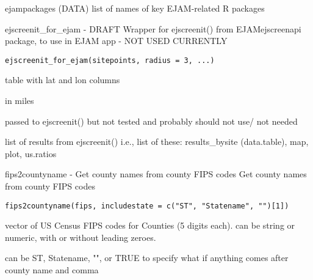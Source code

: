 \documentclass[a4paper]{book}
\begin{document}
%
\begin{Description}\relax
ejampackages (DATA) list of names of key EJAM-related R packages
\end{Description}
%
\begin{Description}\relax
ejscreenit\_for\_ejam - DRAFT
Wrapper for ejscreenit() from EJAMejscreenapi package, to use in EJAM app - NOT USED CURRENTLY
\end{Description}
%
\begin{Usage}
\begin{verbatim}
ejscreenit_for_ejam(sitepoints, radius = 3, ...)
\end{verbatim}
\end{Usage}
%
\begin{Arguments}
\begin{ldescription}
\item[\code{sitepoints}] table with lat and lon columns

\item[\code{radius}] in miles

\item[\code{...}] passed to ejscreenit() but not tested and probably should not use/ not needed
\end{ldescription}
\end{Arguments}
%
\begin{Value}
list of results from ejscreenit()
i.e., list of these: results\_bysite (data.table), map, plot, us.ratios
\end{Value}
%
\begin{Description}\relax
fips2countyname - Get county names from county FIPS codes
Get county names from county FIPS codes
\end{Description}
%
\begin{Usage}
\begin{verbatim}
fips2countyname(fips, includestate = c("ST", "Statename", "")[1])
\end{verbatim}
\end{Usage}
%
\begin{Arguments}
\begin{ldescription}
\item[\code{fips}] vector of US Census FIPS codes for Counties (5 digits each). can be string or numeric, with or without leading zeroes.

\item[\code{includestate}] can be ST, Statename, "", or TRUE to specify what if anything comes after county name and comma
\end{ldescription}
\end{Arguments}
\end{document}
